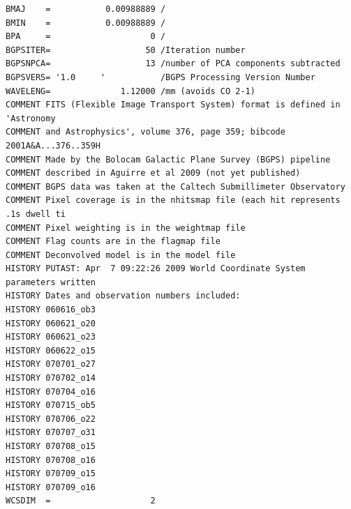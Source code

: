 \documentclass[12pt,preprint]{aastex}
\begin{document}
\begin{appendix}
\begin{verbatim}
BMAJ    =           0.00988889 /                                                
BMIN    =           0.00988889 /                                                
BPA     =                    0 /                                                
BGPSITER=                   50 /Iteration number                                
BGPSNPCA=                   13 /number of PCA components subtracted             
BGPSVERS= '1.0     '           /BGPS Processing Version Number                  
WAVELENG=              1.12000 /mm (avoids CO 2-1)                              
COMMENT FITS (Flexible Image Transport System) format is defined in 'Astronomy  
COMMENT and Astrophysics', volume 376, page 359; bibcode 2001A&A...376..359H    
COMMENT Made by the Bolocam Galactic Plane Survey (BGPS) pipeline               
COMMENT described in Aguirre et al 2009 (not yet published)                     
COMMENT BGPS data was taken at the Caltech Submillimeter Observatory            
COMMENT Pixel coverage is in the nhitsmap file (each hit represents .1s dwell ti
COMMENT Pixel weighting is in the weightmap file                                
COMMENT Flag counts are in the flagmap file                                     
COMMENT Deconvolved model is in the model file                                  
HISTORY PUTAST: Apr  7 09:22:26 2009 World Coordinate System parameters written 
HISTORY Dates and observation numbers included:                                 
HISTORY 060616_ob3                                                              
HISTORY 060621_o20                                                              
HISTORY 060621_o23                                                              
HISTORY 060622_o15                                                              
HISTORY 070701_o27                                                              
HISTORY 070702_o14                                                              
HISTORY 070704_o16                                                              
HISTORY 070715_ob5                                                              
HISTORY 070706_o22                                                              
HISTORY 070707_o31                                                              
HISTORY 070708_o15                                                              
HISTORY 070708_o16                                                              
HISTORY 070709_o15                                                              
HISTORY 070709_o16                                                              
WCSDIM  =                    2                                                  

\end{verbatim}
\end{appendix}
\end{document}
